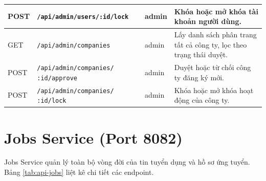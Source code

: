 \documentclass[../DoAn.tex]{subfiles}
\begin{document}
\begin{table}[H]
\begin{tabular}{|p{1.3cm}|p{5.5cm}|p{2.4cm}|p{4.5cm}|}
POST & \texttt{/api/admin/users/:id/lock} & admin & Khóa hoặc mở khóa tài khoản người dùng. \\ \hline
GET  & \texttt{/api/admin/companies} & admin & Lấy danh sách phân trang tất cả công ty, lọc theo trạng thái duyệt. \\ \hline
POST & \texttt{/api/admin/companies/} \newline \texttt{:id/approve} & admin & Duyệt hoặc từ chối công ty đăng ký mới. \\ \hline
POST & \texttt{/api/admin/companies/} \newline \texttt{:id/lock} & admin & Khóa hoặc mở khóa hoạt động của công ty. \\ \hline
\end{tabular}
\end{table}

\section{Jobs Service (Port 8082)}

Jobs Service quản lý toàn bộ vòng đời của tin tuyển dụng và hồ sơ ứng tuyển. Bảng \ref{tab:api-jobs} liệt kê chi tiết các endpoint.
\end{document}
